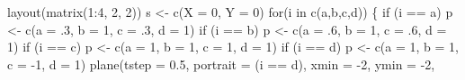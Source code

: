\documentclass[
  a4paper,
  DIV=11,
  numbers=noendperiod,
  oneside]{scrreprt}
\newenvironment{Shaded}{}{}
\newcommand{\AttributeTok}[1]{\textcolor[rgb]{0.84,0.23,0.29}{#1}}
\newcommand{\ControlFlowTok}[1]{\textcolor[rgb]{0.84,0.23,0.29}{#1}}
\newcommand{\DecValTok}[1]{\textcolor[rgb]{0.00,0.36,0.77}{#1}}
\newcommand{\FloatTok}[1]{\textcolor[rgb]{0.00,0.36,0.77}{#1}}
\newcommand{\FunctionTok}[1]{\textcolor[rgb]{0.44,0.26,0.76}{#1}}
\newcommand{\NormalTok}[1]{\textcolor[rgb]{0.14,0.16,0.18}{#1}}
\newcommand{\OtherTok}[1]{\textcolor[rgb]{0.44,0.26,0.76}{#1}}
\newcommand{\SpecialCharTok}[1]{\textcolor[rgb]{0.00,0.36,0.77}{#1}}
\newcommand{\StringTok}[1]{\textcolor[rgb]{0.01,0.18,0.38}{#1}}
\begin{document}
\begin{Shaded}
\begin{Highlighting}[]
\FunctionTok{layout}\NormalTok{(}\FunctionTok{matrix}\NormalTok{(}\DecValTok{1}\SpecialCharTok{:}\DecValTok{4}\NormalTok{, }\DecValTok{2}\NormalTok{, }\DecValTok{2}\NormalTok{))}
\NormalTok{s }\OtherTok{\textless{}{-}} \FunctionTok{c}\NormalTok{(}\AttributeTok{X =} \DecValTok{0}\NormalTok{, }\AttributeTok{Y =} \DecValTok{0}\NormalTok{) }
\ControlFlowTok{for}\NormalTok{(i }\ControlFlowTok{in} \FunctionTok{c}\NormalTok{(}\StringTok{\textquotesingle{}a\textquotesingle{}}\NormalTok{,}\StringTok{\textquotesingle{}b\textquotesingle{}}\NormalTok{,}\StringTok{\textquotesingle{}c\textquotesingle{}}\NormalTok{,}\StringTok{\textquotesingle{}d\textquotesingle{}}\NormalTok{))}
\NormalTok{\{}
  \ControlFlowTok{if}\NormalTok{ (i }\SpecialCharTok{==} \StringTok{\textquotesingle{}a\textquotesingle{}}\NormalTok{) p }\OtherTok{\textless{}{-}} \FunctionTok{c}\NormalTok{(}\AttributeTok{a =}\NormalTok{ .}\DecValTok{3}\NormalTok{, }\AttributeTok{b =} \DecValTok{1}\NormalTok{, }\AttributeTok{c =}\NormalTok{ .}\DecValTok{3}\NormalTok{, }\AttributeTok{d =} \DecValTok{1}\NormalTok{)}
  \ControlFlowTok{if}\NormalTok{ (i }\SpecialCharTok{==} \StringTok{\textquotesingle{}b\textquotesingle{}}\NormalTok{) p }\OtherTok{\textless{}{-}} \FunctionTok{c}\NormalTok{(}\AttributeTok{a =}\NormalTok{ .}\DecValTok{6}\NormalTok{, }\AttributeTok{b =} \DecValTok{1}\NormalTok{, }\AttributeTok{c =}\NormalTok{ .}\DecValTok{6}\NormalTok{, }\AttributeTok{d =} \DecValTok{1}\NormalTok{)}
  \ControlFlowTok{if}\NormalTok{ (i }\SpecialCharTok{==} \StringTok{\textquotesingle{}c\textquotesingle{}}\NormalTok{) p }\OtherTok{\textless{}{-}} \FunctionTok{c}\NormalTok{(}\AttributeTok{a =} \DecValTok{1}\NormalTok{, }\AttributeTok{b =} \DecValTok{1}\NormalTok{, }\AttributeTok{c =} \DecValTok{1}\NormalTok{, }\AttributeTok{d =} \DecValTok{1}\NormalTok{)}
  \ControlFlowTok{if}\NormalTok{ (i }\SpecialCharTok{==} \StringTok{\textquotesingle{}d\textquotesingle{}}\NormalTok{) p }\OtherTok{\textless{}{-}} \FunctionTok{c}\NormalTok{(}\AttributeTok{a =} \DecValTok{1}\NormalTok{, }\AttributeTok{b =} \DecValTok{1}\NormalTok{, }\AttributeTok{c =} \SpecialCharTok{{-}}\DecValTok{1}\NormalTok{, }\AttributeTok{d =} \DecValTok{1}\NormalTok{)}
  \FunctionTok{plane}\NormalTok{(}\AttributeTok{tstep =} \FloatTok{0.5}\NormalTok{, }\AttributeTok{portrait =}\NormalTok{ (i }\SpecialCharTok{==} \StringTok{\textquotesingle{}d\textquotesingle{}}\NormalTok{), }\AttributeTok{xmin =} \SpecialCharTok{{-}}\DecValTok{2}\NormalTok{, }\AttributeTok{ymin =} \SpecialCharTok{{-}}\DecValTok{2}\NormalTok{,}

\end{Highlighting}
\end{Shaded}
\end{document}
